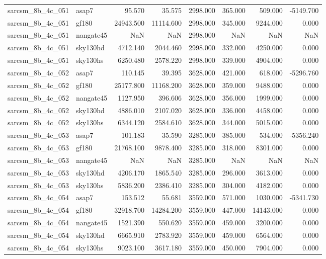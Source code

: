 \begin{tabular}{llrrrrrr}
sarcsm\_8b\_4c\_051 & asap7 & 95.570 & 35.575 & 2998.000 & 365.000 & 509.000 & -5149.700 \\
sarcsm\_8b\_4c\_051 & gf180 & 24943.500 & 11114.600 & 2998.000 & 345.000 & 9244.000 & 0.000 \\
sarcsm\_8b\_4c\_051 & nangate45 & NaN & NaN & 2998.000 & NaN & NaN & NaN \\
sarcsm\_8b\_4c\_051 & sky130hd & 4712.140 & 2044.460 & 2998.000 & 332.000 & 4250.000 & 0.000 \\
sarcsm\_8b\_4c\_051 & sky130hs & 6250.480 & 2578.220 & 2998.000 & 339.000 & 4904.000 & 0.000 \\
sarcsm\_8b\_4c\_052 & asap7 & 110.145 & 39.395 & 3628.000 & 421.000 & 618.000 & -5296.760 \\
sarcsm\_8b\_4c\_052 & gf180 & 25177.800 & 11168.200 & 3628.000 & 359.000 & 9488.000 & 0.000 \\
sarcsm\_8b\_4c\_052 & nangate45 & 1127.950 & 396.606 & 3628.000 & 356.000 & 1999.000 & 0.000 \\
sarcsm\_8b\_4c\_052 & sky130hd & 4886.010 & 2107.020 & 3628.000 & 336.000 & 4458.000 & 0.000 \\
sarcsm\_8b\_4c\_052 & sky130hs & 6344.120 & 2584.610 & 3628.000 & 344.000 & 5015.000 & 0.000 \\
sarcsm\_8b\_4c\_053 & asap7 & 101.183 & 35.590 & 3285.000 & 385.000 & 534.000 & -5356.240 \\
sarcsm\_8b\_4c\_053 & gf180 & 21768.100 & 9878.400 & 3285.000 & 318.000 & 8301.000 & 0.000 \\
sarcsm\_8b\_4c\_053 & nangate45 & NaN & NaN & 3285.000 & NaN & NaN & NaN \\
sarcsm\_8b\_4c\_053 & sky130hd & 4206.170 & 1865.540 & 3285.000 & 296.000 & 3613.000 & 0.000 \\
sarcsm\_8b\_4c\_053 & sky130hs & 5836.200 & 2386.410 & 3285.000 & 304.000 & 4182.000 & 0.000 \\
sarcsm\_8b\_4c\_054 & asap7 & 153.512 & 55.681 & 3559.000 & 571.000 & 1030.000 & -5341.730 \\
sarcsm\_8b\_4c\_054 & gf180 & 32918.700 & 14284.200 & 3559.000 & 447.000 & 14143.000 & 0.000 \\
sarcsm\_8b\_4c\_054 & nangate45 & 1521.390 & 550.620 & 3559.000 & 459.000 & 3200.000 & 0.000 \\
sarcsm\_8b\_4c\_054 & sky130hd & 6665.910 & 2783.920 & 3559.000 & 459.000 & 6564.000 & 0.000 \\
sarcsm\_8b\_4c\_054 & sky130hs & 9023.100 & 3617.180 & 3559.000 & 450.000 & 7904.000 & 0.000 \\

\end{tabular}
